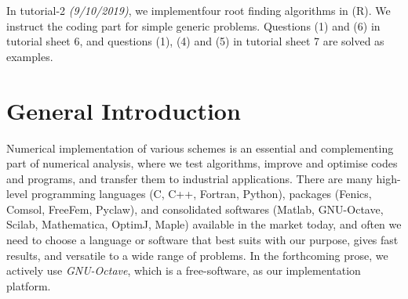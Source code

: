 \documentclass[11pt,a4paper,reqno]{article}
\begin{document}
In tutorial-2 \emph{(9/10/2019)}, we implementfour root finding algorithms in (R). We instruct the coding part for simple generic problems. Questions (1) and (6) in tutorial sheet 6, and questions (1), (4) and (5) in tutorial sheet 7 are solved as examples. 
\section{General Introduction}
Numerical implementation of various schemes is an essential and complementing part of numerical analysis, where we test algorithms, improve and optimise codes and programs, and transfer them to industrial applications. There are many high-level programming languages (C, C++, Fortran, Python), packages (Fenics, Comsol, FreeFem, Pyclaw), and consolidated softwares (Matlab, GNU-Octave, Scilab, Mathematica, OptimJ, Maple) available in the market today, and often we need to choose a language or software that best suits with our purpose, gives fast results, and versatile to a wide range of problems. In the forthcoming prose, we actively use \emph{GNU-Octave}, which is a free-software, as our implementation platform.
\end{document}
